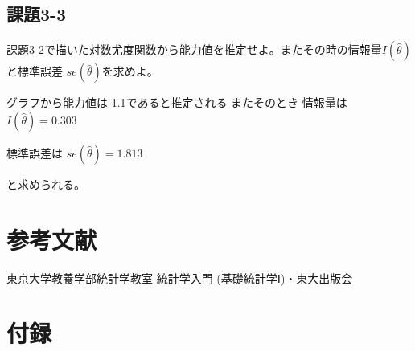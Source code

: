 \documentclass{jsarticle}
\begin{document}
\subsection{課題3-3}
課題3-2で描いた対数尤度関数から能力値を推定せよ。またその時の情報量$I(\hat{\theta})$と標準誤差
$se(\hat{\theta})$を求めよ。

グラフから能力値は-1.1であると推定される
またそのとき
情報量は
$I(\hat{\theta}) = 0.303$

標準誤差は
$se(\hat{\theta}) = 1.813$

と求められる。

\section{参考文献}
\begin{thebibliography}{9}
   東京大学教養学部統計学教室 統計学入門 (基礎統計学Ⅰ)・東大出版会
\end{thebibliography}

\section{付録}
\end{document}
